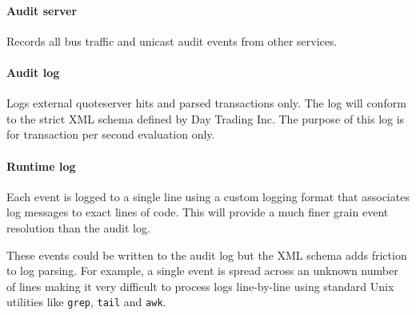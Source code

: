 \paragraph{Audit server}
Records all bus traffic and unicast audit events from other services.

\paragraph{Audit log}
Logs external quoteserver hits and parsed transactions only.
The log will conform to the strict XML schema defined by Day Trading Inc.
The purpose of this log is for transaction per second evaluation only.

\paragraph{Runtime log}
Each event is logged to a single line using a custom logging format that associates log messages to exact lines of code.
This will provide a much finer grain event resolution than the audit log.

These events could be written to the audit log but the XML schema adds friction to log parsing.
For example, a single event is spread across an unknown number of lines making it very difficult to process logs line-by-line using standard Unix utilities like \texttt{grep}, \texttt{tail} and \texttt{awk}.
